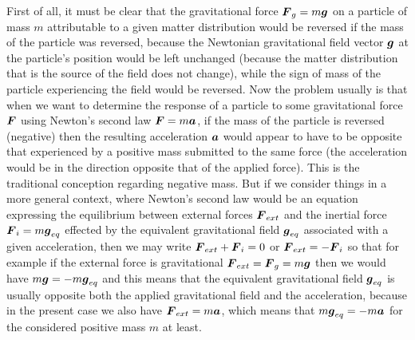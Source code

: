 \documentclass[notitlepage,12pt]{report}
\newcommand{\bm}[1]{\mbox{\boldmath $#1$}}
\begin{document}
First of all, it must be clear that the gravitational force $\bm{F}_g=m\bm{g}$ on a particle of mass $m$ attributable to a given matter distribution would be reversed if the mass of the particle was reversed, because the Newtonian gravitational field vector $\bm{g}$ at the particle's position would be left unchanged (because the matter distribution that is the source of the field does not change), while the sign of mass of the particle experiencing the field would be reversed. Now the problem usually is that when we want to determine the response of a particle to some gravitational force $\bm{F}$ using Newton's second law $\bm{F}=m\bm{a}$, if the mass of the particle is reversed (negative) then the resulting acceleration $\bm{a}$ would appear to have to be opposite that experienced by a positive mass submitted to the same force (the acceleration would be in the direction opposite that of the applied force). This is the traditional conception regarding negative mass. But if we consider things in a more general context, where Newton's second law would be an equation expressing the equilibrium between external forces $\bm{F}_{ext}$ and the inertial force $\bm{F}_i=m\bm{g}_{eq}$ effected by the equivalent gravitational field $\bm{g}_{eq}$ associated with a given acceleration, then we may write $\bm{F}_{ext}+\bm{F}_i=0$ or $\bm{F}_{ext}=-\bm{F}_i$ so that for example if the external force is gravitational $\bm{F}_{ext}=\bm{F}_g=m\bm{g}$ then we would have $m\bm{g}=-m\bm{g}_{eq}$ and this means that the equivalent gravitational field $\bm{g}_{eq}$ is usually opposite both the applied gravitational field and the acceleration, because in the present case we also have $\bm{F}_{ext}=m\bm{a}$, which means that $m\bm{g}_{eq}=-m\bm{a}$ for the considered positive mass $m$ at least.
\end{document}
